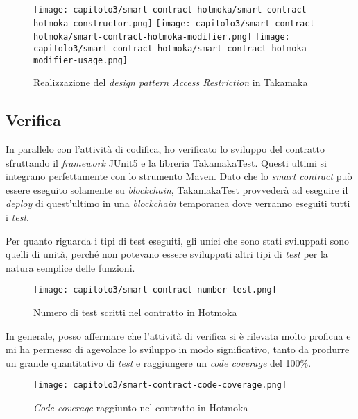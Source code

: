 \begin{figure}[h!]
  \centering
  \texttt{[image: capitolo3/smart-contract-hotmoka/smart-contract-hotmoka-constructor.png]}
  \texttt{[image: capitolo3/smart-contract-hotmoka/smart-contract-hotmoka-modifier.png]}
  \texttt{[image: capitolo3/smart-contract-hotmoka/smart-contract-hotmoka-modifier-usage.png]}
  \caption{Realizzazione del \textit{design pattern Access Restriction} in Takamaka}
\end{figure}

\subsection{Verifica}
In parallelo con l'attività di codifica, ho verificato lo sviluppo del contratto sfruttando il \textit{framework} JUnit5 e la libreria TakamakaTest. Questi ultimi si integrano perfettamente con lo strumento Maven. Dato che lo \textit{smart contract} può essere eseguito solamente su \textit{blockchain}, TakamakaTest provvederà ad eseguire il \textit{deploy} di quest'ultimo in una \textit{blockchain} temporanea dove verranno eseguiti tutti i \textit{test}. 

Per quanto riguarda i tipi di test eseguiti, gli unici che sono stati sviluppati sono quelli di unità, perché non potevano essere sviluppati altri tipi di \textit{test} per la natura semplice delle funzioni.

\clearpage

\begin{figure}[h!]
  \centering
  \texttt{[image: capitolo3/smart-contract-number-test.png]}
  \caption{Numero di test scritti nel contratto in Hotmoka}
\end{figure}

In generale, posso affermare che l'attività di verifica si è rilevata molto proficua e mi ha permesso di agevolare lo sviluppo in modo significativo, tanto da produrre un grande quantitativo di \textit{test} e raggiungere un \textit{code coverage} del 100\%.

\clearpage

\begin{figure}[h!]
  \centering
  \texttt{[image: capitolo3/smart-contract-code-coverage.png]}
  \caption{\textit{Code coverage} raggiunto nel contratto in Hotmoka}
\end{figure}

